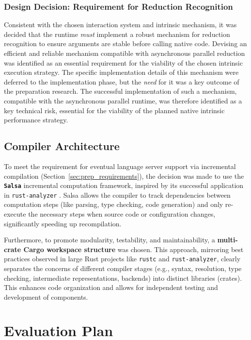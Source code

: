 \subsubsection*{Design Decision: Requirement for Reduction Recognition}
Consistent with the chosen interaction system and intrinsic mechanism, it was decided that the runtime \textit{must} implement a robust mechanism for reduction recognition to ensure arguments are stable before calling native code. Devising an efficient and reliable mechanism compatible with asynchronous parallel reduction was identified as an essential requirement for the viability of the chosen intrinsic execution strategy. The specific implementation details of this mechanism were deferred to the implementation phase, but the \textit{need} for it was a key outcome of the preparation research. The successful implementation of such a mechanism, compatible with the asynchronous parallel runtime, was therefore identified as a key technical risk, essential for the viability of the planned native intrinsic performance strategy.

\subsection{Compiler Architecture}\label{sec:prep_decision_compiler}

To meet the requirement for eventual language server support via incremental compilation (Section~\ref{sec:prep_requirements}), the decision was made to use the \textbf{\texttt{Salsa}} incremental computation framework, inspired by its successful application in \texttt{rust-analyzer} \cite{RustAnalyzer}. Salsa allows the compiler to track dependencies between computation steps (like parsing, type checking, code generation) and only re-execute the necessary steps when source code or configuration changes, significantly speeding up recompilation.

Furthermore, to promote modularity, testability, and maintainability, a \textbf{multi-crate Cargo workspace structure} was chosen. This approach, mirroring best practices observed in large Rust projects like \texttt{rustc} and \texttt{rust-analyzer}, clearly separates the concerns of different compiler stages (e.g., syntax, resolution, type checking, intermediate representations, backends) into distinct libraries (crates). This enhances code organization and allows for independent testing and development of components.

\section{Evaluation Plan}\label{sec:prep_evaluation}

